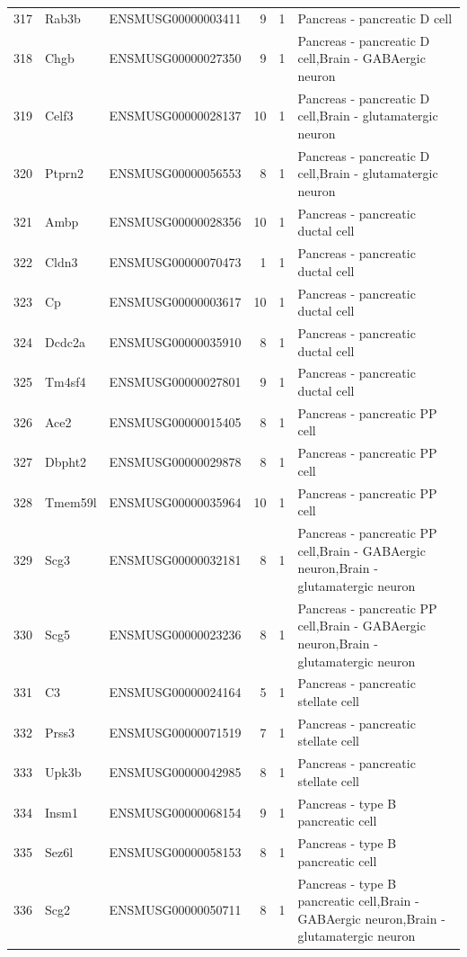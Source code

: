 \begin{table}[ht]
{\begin{tabular}{lllrrl}
        317 & Rab3b & ENSMUSG00000003411 & 9 & 1 & Pancreas - pancreatic D cell \\
        318 & Chgb & ENSMUSG00000027350 & 9 & 1 & Pancreas - pancreatic D cell,Brain - GABAergic neuron \\
        319 & Celf3 & ENSMUSG00000028137 & 10 & 1 & Pancreas - pancreatic D cell,Brain - glutamatergic neuron \\
        320 & Ptprn2 & ENSMUSG00000056553 & 8 & 1 & Pancreas - pancreatic D cell,Brain - glutamatergic neuron \\
        321 & Ambp & ENSMUSG00000028356 & 10 & 1 & Pancreas - pancreatic ductal cell \\
        322 & Cldn3 & ENSMUSG00000070473 & 1 & 1 & Pancreas - pancreatic ductal cell \\
        323 & Cp & ENSMUSG00000003617 & 10 & 1 & Pancreas - pancreatic ductal cell \\
        324 & Dcdc2a & ENSMUSG00000035910 & 8 & 1 & Pancreas - pancreatic ductal cell \\
        325 & Tm4sf4 & ENSMUSG00000027801 & 9 & 1 & Pancreas - pancreatic ductal cell \\
        326 & Ace2 & ENSMUSG00000015405 & 8 & 1 & Pancreas - pancreatic PP cell \\
        327 & Dbpht2 & ENSMUSG00000029878 & 8 & 1 & Pancreas - pancreatic PP cell \\
        328 & Tmem59l & ENSMUSG00000035964 & 10 & 1 & Pancreas - pancreatic PP cell \\
        329 & Scg3 & ENSMUSG00000032181 & 8 & 1 & Pancreas - pancreatic PP cell,Brain - GABAergic neuron,Brain - glutamatergic neuron \\
        330 & Scg5 & ENSMUSG00000023236 & 8 & 1 & Pancreas - pancreatic PP cell,Brain - GABAergic neuron,Brain - glutamatergic neuron \\
        331 & C3 & ENSMUSG00000024164 & 5 & 1 & Pancreas - pancreatic stellate cell \\
        332 & Prss3 & ENSMUSG00000071519 & 7 & 1 & Pancreas - pancreatic stellate cell \\
        333 & Upk3b & ENSMUSG00000042985 & 8 & 1 & Pancreas - pancreatic stellate cell \\
        334 & Insm1 & ENSMUSG00000068154 & 9 & 1 & Pancreas - type B pancreatic cell \\
        335 & Sez6l & ENSMUSG00000058153 & 8 & 1 & Pancreas - type B pancreatic cell \\
        336 & Scg2 & ENSMUSG00000050711 & 8 & 1 & Pancreas - type B pancreatic cell,Brain - GABAergic neuron,Brain - glutamatergic neuron \\

\end{tabular}}
\end{table}
